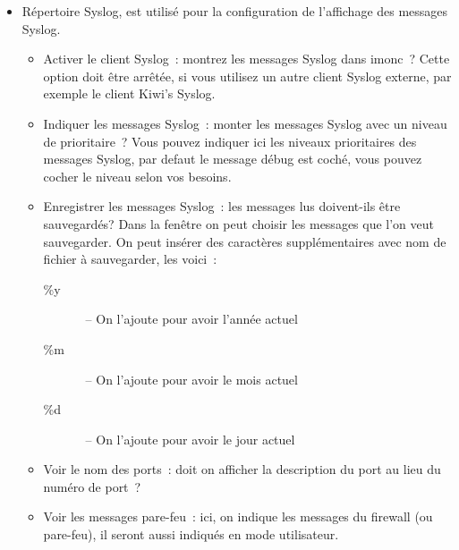 \begin{itemize}
  \item Répertoire Syslog, est utilisé pour la configuration de l'affichage
    des messages Syslog.
    \begin{itemize}
      \item Activer le client Syslog~: montrez les messages Syslog dans imonc~?
        Cette option doit être arrêtée, si vous utilisez un autre client Syslog
        externe, par exemple le client Kiwi's Syslog.
      \item Indiquer les messages Syslog~: monter les messages Syslog avec un
        niveau de prioritaire~? Vous pouvez indiquer ici les niveaux prioritaires
        des messages Syslog, par defaut le message débug est coché, vous pouvez
        cocher le niveau selon vos besoins.
      \item Enregistrer les messages Syslog~: les messages lus doivent-ils être
        sauvegardés? Dans la fenêtre on peut choisir les messages que l'on veut
        sauvegarder. On peut insérer des caractères supplémentaires avec nom de
        fichier à sauvegarder, les voici~:
        \begin{description}
          \item[\%y]~-- On l'ajoute pour avoir l'année actuel
          \item[\%m]~-- On l'ajoute pour avoir le mois actuel
          \item[\%d]~-- On l'ajoute pour avoir le jour actuel
        \end{description}
      \item Voir le nom des ports~: doit on afficher la description du port au
        lieu du numéro de port~?
      \item Voir les messages pare-feu~: ici, on indique les messages du firewall
        (ou pare-feu), il seront aussi indiqués en mode utilisateur.
    \end{itemize}


\end{itemize}
